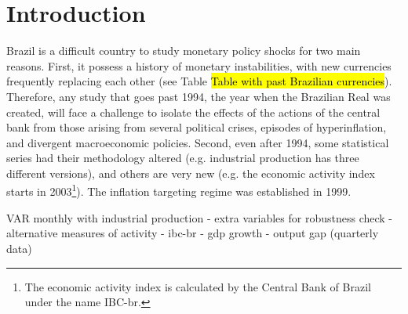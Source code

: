 \section{Introduction}

Brazil is a difficult country to study monetary policy shocks for two main reasons. First, it possess a history of monetary instabilities, with new currencies frequently replacing each other (see Table \hl{Table with past Brazilian currencies}). Therefore, any study that goes past 1994, the year when the Brazilian Real was created, will face a challenge to isolate the effects of the actions of the central bank from those arising from several political crises, episodes of hyperinflation, and divergent macroeconomic policies. Second, even after 1994, some statistical series had their methodology altered (e.g. industrial production has three different versions), and others are very new (e.g. the economic activity index starts in 2003\footnote{The economic activity index is calculated by the Central Bank of Brazil under the name IBC-br.}).
The inflation targeting regime was established in 1999.

VAR monthly with industrial production
    - extra variables for robustness check
    - alternative measures of activity
        - ibc-br
        - gdp growth
        - output gap (quarterly data)
